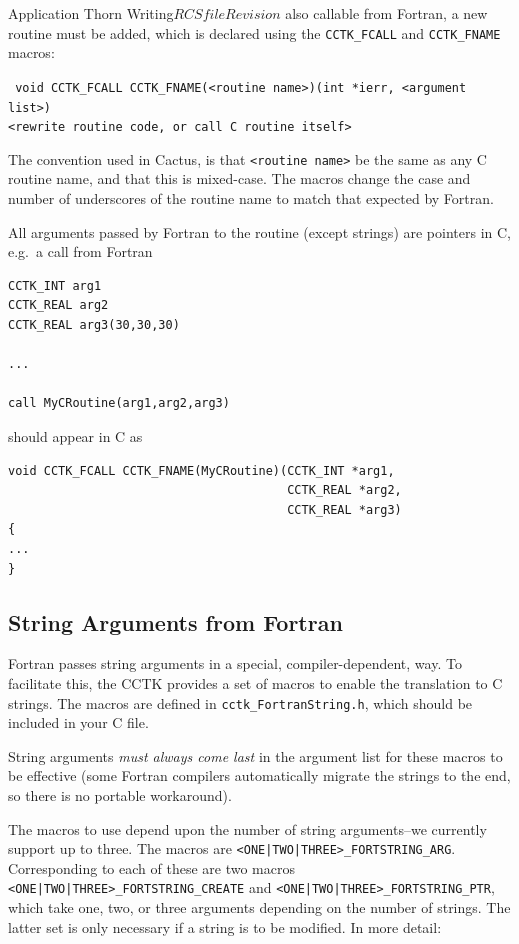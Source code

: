 \begin{cactuspart}{Application Thorn Writing}{$RCSfile$}{$Revision$}
also callable from Fortran, a new routine must be added, which is
declared using the \texttt{CCTK\_FCALL} and \texttt{CCTK\_FNAME} macros:

{\tt
void CCTK\_FCALL CCTK\_FNAME(<routine name>)(int *ierr, <argument list>)\\
<rewrite routine code, or call C routine itself>
}

The convention used in Cactus, is that \texttt{<routine name>} be the same as any
C routine name, and that this is mixed-case.  The macros change
the case and number of underscores of the routine name to match that expected
by Fortran.

All arguments passed by Fortran to the routine (except strings) are
pointers in C, e.g.\ a call from Fortran

\begin{verbatim}
CCTK_INT arg1
CCTK_REAL arg2
CCTK_REAL arg3(30,30,30)

...

call MyCRoutine(arg1,arg2,arg3)
\end{verbatim}

should appear in C as

\begin{verbatim}
void CCTK_FCALL CCTK_FNAME(MyCRoutine)(CCTK_INT *arg1,
                                       CCTK_REAL *arg2,
                                       CCTK_REAL *arg3)
{
...
}
\end{verbatim}

\subsection{String Arguments from Fortran}

Fortran passes string arguments in a special, compiler-dependent, way.
To facilitate this, the CCTK provides a set of macros to enable the
translation to C strings.
The macros are defined in \texttt{cctk\_FortranString.h}, which
should be included in your C file.

String arguments \emph{must always come last} in the argument list for
these macros to be effective (some Fortran compilers automatically
migrate the strings to the end, so there is no portable workaround).

The macros to use depend upon the number of string arguments--we
currently support up to three.  The macros are
\texttt{<ONE|TWO|THREE>\_FORTSTRING\_ARG}.
Corresponding to each of these are two macros
\texttt{<ONE|TWO|THREE>\_FORTSTRING\_CREATE} and
\texttt{<ONE|TWO|THREE>\_FORTSTRING\_PTR},
which take one, two, or three arguments depending on the number of strings.
The latter set is only necessary if a string is to be modified.
In more detail:


\end{cactuspart}

